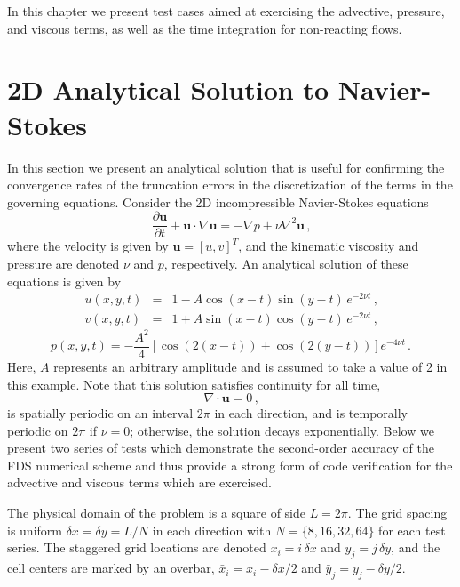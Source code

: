 \documentclass[11pt]{book}
\begin{document}
In this chapter we present test cases aimed at exercising the advective, pressure, and viscous terms, as well as the time integration for non-reacting flows.


\section{2D Analytical Solution to Navier-Stokes}
\label{ns2d}

In this section we present an analytical solution that is useful for confirming the convergence rates of the truncation errors in the discretization of the terms in
the governing equations. Consider the 2D incompressible Navier-Stokes equations
\begin{equation}
\label{eqn_NS}
\frac{\partial \mathbf{u}}{\partial t} + \mathbf{u} \cdot \nabla \mathbf{u} = - \nabla{p} + \nu \nabla^2 \mathbf{u} \,\mbox{,}
\end{equation}
where the velocity is given by $\mathbf{u} = [u, v]^T$, and the kinematic viscosity and pressure are denoted $\nu$ and $p$, respectively.
An analytical solution of these equations is given by \cite{McDermott:NS2D}
\begin{eqnarray}
\label{eqn_usoln}
u(x,y,t) &=& 1 - A\cos(x-t)\sin(y-t)\,e^{-2\nu t} \,\mbox{,} \\
v(x,y,t) &=& 1 + A\sin(x-t)\cos(y-t)\,e^{-2\nu t} \,\mbox{,}
\end{eqnarray}
\begin{equation}
p(x,y,t) = -\frac{A^2}{4} \left[ \cos(2(x-t))+\cos(2(y-t))\right]e^{-4\nu t} \,\mbox{.}
\end{equation}
Here, $A$ represents an arbitrary amplitude and is assumed to take a value of 2 in this example.
Note that this solution satisfies continuity for all time,
\begin{equation}
\label{eqn_divfree}
\nabla\cdot\mathbf{u} = 0 \,\mbox{,}
\end{equation}
is spatially periodic on an interval $2\pi$ in each direction, and is temporally periodic on $2\pi$ if $\nu=0$; otherwise, the solution decays exponentially.
Below we present two series of tests which demonstrate the second-order accuracy of the FDS numerical scheme and thus provide a strong form of code verification
for the advective and viscous terms which are exercised.

The physical domain of the problem is a square of side $L=2\pi$.  The grid spacing is uniform $\delta x = \delta y = L/N$ in each direction
with $N =\{8,16,32,64\}$ for each test series.  The staggered grid locations are denoted $x_i = i \, \delta x$ and $y_j = j \, \delta y$, and the cell
centers are marked by an overbar, $\bar{x}_i = x_i - \delta x/2$ and $\bar{y}_j = y_j - \delta y/2$.
\end{document}
